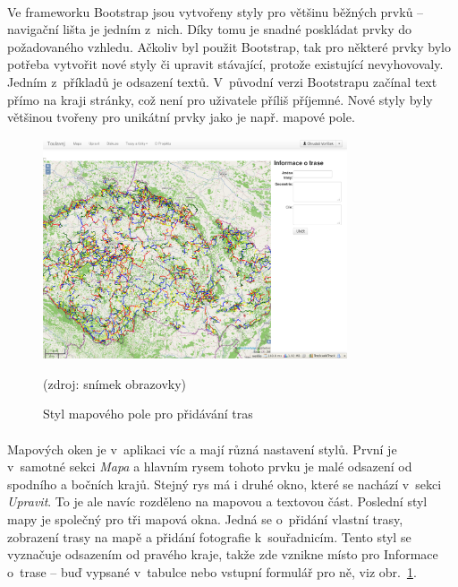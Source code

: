 \documentclass[11pt,a4paper,titlepage,oneside]{book}
\begin{document}
			\paragraph{} Ve frameworku Bootstrap jsou vytvořeny styly pro většinu běžných prvků -- navigační lišta je jedním z~nich. Díky tomu je snadné poskládat prvky do požadovaného vzhledu. Ačkoliv byl použit Bootstrap, tak pro některé prvky bylo potřeba vytvořit nové styly či upravit stávající, protože existující nevyhovovaly. Jedním z~příkladů je odsazení textů. V~původní verzi Bootstrapu začínal text přímo na kraji stránky, což není pro uživatele příliš příjemné. Nové styly byly většinou tvořeny pro unikátní prvky jako je např. mapové pole.
		\begin{figure}[!h]
			\begin{center}
				\includegraphics[width=9cm]{obrazky/toulavej/addTrack.png}
				\caption{Styl mapového pole pro přidávání tras}
				\label{fig:addTrack}
				(zdroj: snímek obrazovky)
			\end{center}
		\end{figure}	
			\paragraph{} Mapových oken je v~aplikaci víc a mají různá nastavení stylů. První je v~samotné sekci \textit{Mapa} a hlavním rysem tohoto prvku je malé odsazení od spodního a bočních krajů. Stejný rys má i druhé okno, které se nachází v~sekci \textit{Upravit}. To je ale navíc rozděleno na mapovou a textovou část. Poslední styl mapy je společný pro tři mapová okna. Jedná se o~přidání vlastní trasy, zobrazení trasy na mapě a přidání fotografie k~souřadnicím. Tento styl se vyznačuje odsazením od pravého kraje, takže zde vznikne místo pro Informace o~trase -- buď vypsané v~tabulce nebo vstupní formulář pro ně, viz obr.~\ref{fig:addTrack}.
\end{document}
